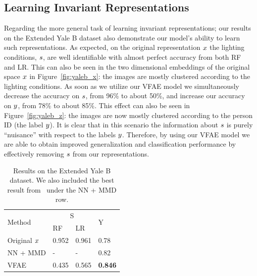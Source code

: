 \subsection{Learning Invariant Representations}
Regarding the more general task of learning invariant representations; our results on the Extended Yale B dataset also demonstrate our model's ability to learn such representations. As expected, on the original representation $\*x$ the lighting conditions, $\*s$, are well identifiable with almost perfect accuracy from both RF and LR. This can also be seen in the two dimensional embeddings of the original space $\*x$ in Figure~\ref{fig:yaleb_x}: the images are mostly clustered according to the lighting conditions. As soon as we utilize our VFAE model we simultaneously decrease the accuracy on $\*s$, from 96\% to about 50\%, and increase our accuracy on $\*y$, from 78\% to about 85\%. This effect can also be seen in Figure~\ref{fig:yaleb_z}: the images are now mostly clustered according to the person ID (the label $\*y$). It is clear that in this scenario the information about  $\*s$ is purely ``nuisance'' with respect to the labels $\*y$. Therefore, by using our VFAE model we are able to obtain improved generalization and classification performance by effectively removing $\*s$ from our representations.
   
\begin{table}[ht]
	\caption {Results on the Extended Yale B dataset. We also included the best result from~\cite{li2014learning} under the NN + MMD row.}
	\centering
	\label{tab:yaleb_results}
	\begin{center}
		\begin{tabular}{l|l|l|l}
			\hline
			\multirow{2}{*}{Method}  & \multicolumn{2}{c|}{S}  &  \multirow{2}{*}{Y} \\\cline{2-3}
			& RF & LR \\\hline
			Original $\*x$ & 0.952 & 0.961 & 0.78\\ 
			NN + MMD & - & - & 0.82\\
			VFAE & 0.435 & 0.565 & \textbf{0.846}\\
			\hline
		\end{tabular}
		\end{center}
\end{table}

